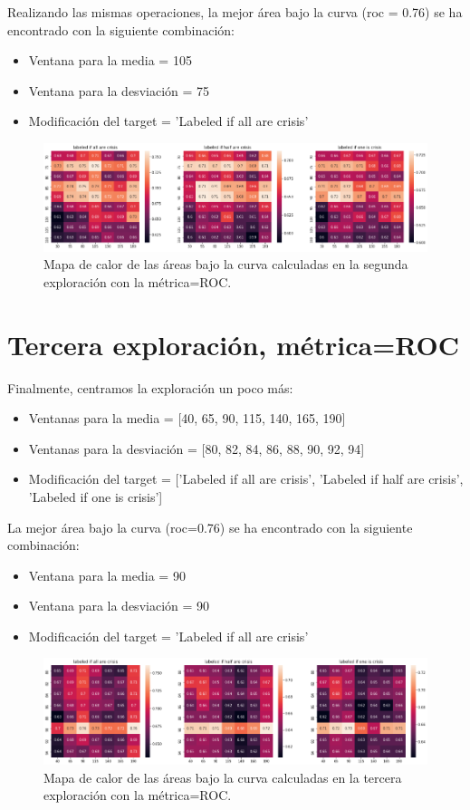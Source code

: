 \documentclass[a4paper,12pt,twoside,oldfontcommands]{memoir}
\begin{document}
Realizando las mismas operaciones, la mejor área bajo la curva (roc = 0.76) se ha encontrado con la siguiente combinación: 
\begin{itemize}
    \item Ventana para la media = 105
    \item Ventana para la desviación = 75
    \item Modificación del target = 'Labeled if all are crisis'
\end{itemize}

\begin{figure}
    \centering
    \includegraphics[width=1\textwidth]{images/heatmap2.png}
    \caption{Mapa de calor de las áreas bajo la curva calculadas en la segunda exploración con la métrica=ROC.}
    \label{fig:heatmap2}
\end{figure}

\section{Tercera exploración, métrica=ROC}
Finalmente, centramos la exploración un poco más: 
\begin{itemize}
    \item Ventanas para la media = [40, 65, 90, 115, 140, 165, 190]
    \item Ventanas para la desviación = [80, 82, 84, 86, 88, 90, 92, 94]
    \item Modificación del target = ['Labeled if all are crisis', 'Labeled if half are crisis', 'Labeled if one is crisis']
\end{itemize}

La mejor área bajo la curva (roc=0.76) se ha encontrado con la siguiente combinación: 
\begin{itemize}
    \item Ventana para la media = 90
    \item Ventana para la desviación = 90
    \item Modificación del target = 'Labeled if all are crisis'
\end{itemize}

\begin{figure}
    \centering
    \includegraphics[width=1\textwidth]{images/heatmap3.png}
    \caption{Mapa de calor de las áreas bajo la curva calculadas en la tercera exploración con la métrica=ROC.}
    \label{fig:heatmap3}
\end{figure}
\end{document}
